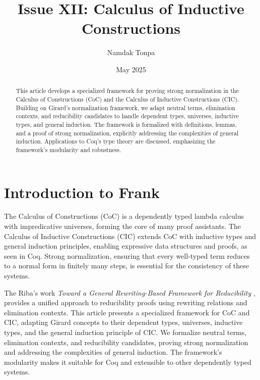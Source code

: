 \documentclass{article}
\begin{document}
\title{Issue XII: Calculus of Inductive Constructions}
\author{Namdak Tonpa}
\date{May 2025}

\maketitle

\begin{abstract}
This article develops a specialized framework for proving strong normalization
in the Calculus of Constructions (CoC) and the Calculus of Inductive Constructions (CIC).
Building on Girard’s normalization framework, we adapt neutral terms,
elimination contexts, and reducibility candidates to handle dependent types,
universes, inductive types, and general induction. The framework is formalized
with definitions, lemmas, and a proof of strong normalization, explicitly
addressing the complexities of general induction. Applications to Coq’s type
theory are discussed, emphasizing the framework’s modularity and robustness.
\end{abstract}

\ifincludeTOC
  \tableofcontents
\fi


\section{Introduction to Frank}

The Calculus of Constructions (CoC) \cite{coquand1988} is a dependently typed
lambda calculus with impredicative universes, forming the core of many proof assistants.
The Calculus of Inductive Constructions (CIC) \cite{coquand1990} extends CoC with inductive
types and general induction principles, enabling expressive data structures and proofs,
as seen in Coq. Strong normalization, ensuring that every well-typed term reduces to
a normal form in finitely many steps, is essential for the consistency of these systems.

The Riba’s work \emph{Toward a General Rewriting-Based Framework for Reducibility} \cite{riba2008},
provides a unified approach to reducibility proofs using rewriting relations and elimination contexts.
This article presents a specialized framework for CoC and CIC, adapting Girard concepts
to their dependent types, universes, inductive types, and the general induction principle of CIC.
We formalize neutral terms, elimination contexts, and reducibility candidates,
proving strong normalization and addressing the complexities of general induction.
The framework’s modularity makes it suitable for Coq and extensible to other dependently typed systems.
\end{document}
